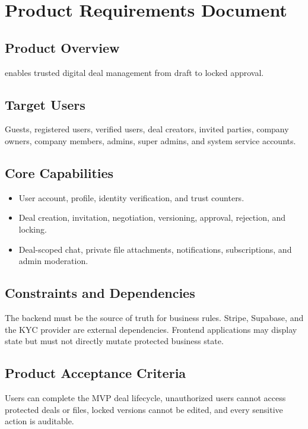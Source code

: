 \chapter{Product Requirements Document}
\section{Product Overview}
\projectname{} enables trusted digital deal management from draft to locked approval.
\section{Target Users}
Guests, registered users, verified users, deal creators, invited parties, company owners, company members, admins, super admins, and system service accounts.
\section{Core Capabilities}
\begin{itemize}
  \item User account, profile, identity verification, and trust counters.
  \item Deal creation, invitation, negotiation, versioning, approval, rejection, and locking.
  \item Deal-scoped chat, private file attachments, notifications, subscriptions, and admin moderation.
\end{itemize}
\section{Constraints and Dependencies}
The backend must be the source of truth for business rules. Stripe, Supabase, and the KYC provider are external dependencies. Frontend applications may display state but must not directly mutate protected business state.
\section{Product Acceptance Criteria}
Users can complete the MVP deal lifecycle, unauthorized users cannot access protected deals or files, locked versions cannot be edited, and every sensitive action is auditable.
